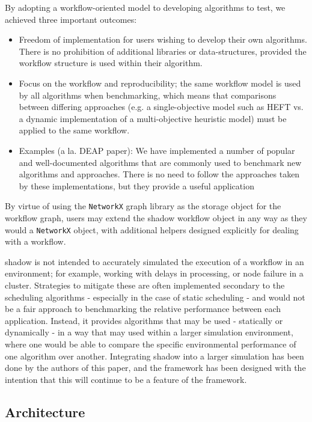 \documentclass{article}
\begin{document}
\begin{multicols}{2}
By adopting a workflow-oriented model to developing algorithms to test, we achieved three important outcomes: 
\begin{itemize}
    \item Freedom of implementation for users wishing to develop their own algorithms. There is no prohibition of additional libraries or data-structures, provided the workflow structure is used within their algorithm.
	\item Focus on the workflow and reproducibility; the same workflow model is used by all algorithms when benchmarking, which means that comparisons between differing approaches (e.g. a single-objective model such as HEFT vs. a dynamic implementation of a multi-objective heuristic model) must be applied to the same workflow. 
	\item Examples (a la. DEAP paper): We have implemented a number of popular and well-documented algorithms that are commonly used to benchmark new algorithms and approaches. There is no need to follow the approaches taken by these implementations, but they provide a useful application 
\end{itemize}
By virtue of using the \texttt{NetworkX} graph library as the storage object for the workflow graph, users may extend the shadow workflow object in any way as they would a \texttt{NetworkX} object, with additional helpers designed explicitly for dealing with a workflow. 

shadow is not intended to accurately simulated the execution of a workflow in an environment; for example, working with delays in processing, or node failure in a cluster. Strategies to mitigate these are often implemented secondary to the scheduling algorithms - especially in the case of static scheduling - and would not be a fair approach to benchmarking the relative performance between each application. Instead, it provides algorithms that may be used - statically or dynamically - in a way that may used within a larger simulation environment, where one would be able to compare the specific environmental performance of one algorithm over another. Integrating shadow into a larger simulation has been done by the authors of this paper, and the framework has been designed with the intention that this will continue to be a feature of the framework.


\subsection*{Architecture}


\end{multicols}
\end{document}
